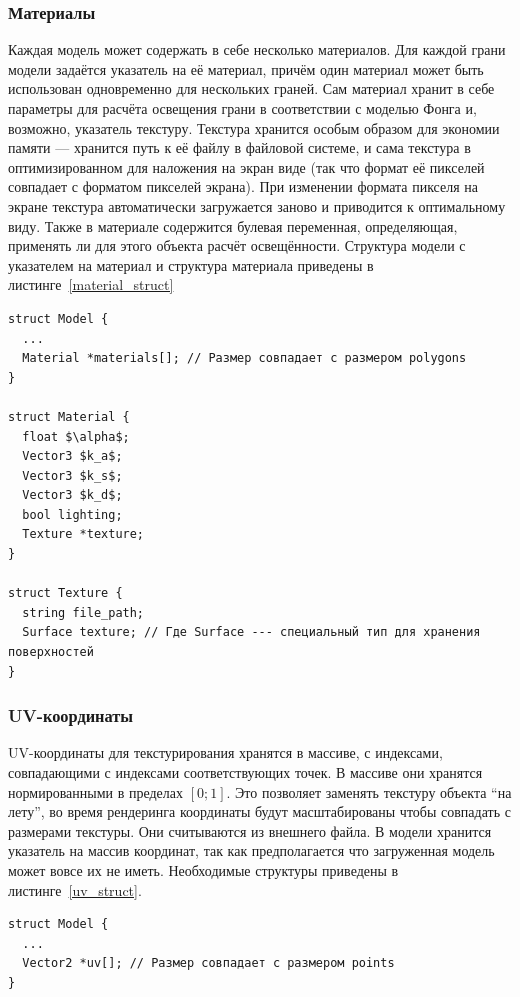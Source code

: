 \documentclass[a4paper,12pt]{report}
\numberwithin{equation}{section}
\begin{document}
\subsubsection{Материалы}
Каждая модель может содержать в себе несколько материалов. Для каждой грани модели задаётся указатель на её материал, причём один материал может быть использован одновременно для нескольких граней. Сам материал хранит в себе параметры для расчёта освещения грани в соответствии с моделью Фонга и, возможно, указатель текстуру. Текстура хранится особым образом для экономии памяти --- хранится путь к её файлу в файловой системе, и сама текстура в оптимизированном для наложения на экран виде (так что формат её пикселей совпадает с форматом пикселей экрана). При изменении формата пикселя на экране текстура автоматически загружается заново и приводится к оптимальному виду. Также в материале содержится булевая переменная, определяющая, применять ли для этого объекта расчёт освещённости. Структура модели с указателем на материал и структура материала приведены в листинге~\ref{material_struct}

\begin{lstlisting}[float=p,caption={Структура данных ``Модель'' с добавленным полем материала и структуры ``Материал'' и ``Текстура''},label=material_struct]
struct Model {
  ...
  Material *materials[]; // Размер совпадает с размером polygons
}

struct Material {
  float $\alpha$;
  Vector3 $k_a$;
  Vector3 $k_s$;
  Vector3 $k_d$;
  bool lighting;
  Texture *texture;
}

struct Texture {
  string file_path;
  Surface texture; // Где Surface --- специальный тип для хранения поверхностей
}
\end{lstlisting}

\subsubsection{UV-координаты}
UV-координаты для текстурирования хранятся в массиве, с индексами, совпадающими с индексами соответствующих точек. В массиве они хранятся нормированными в пределах $[0;1]$. Это позволяет заменять текстуру объекта ``на лету'', во время рендеринга координаты будут масштабированы чтобы совпадать с размерами текстуры. Они считываются из внешнего файла. В модели хранится указатель на массив координат, так как предполагается что загруженная модель может вовсе их не иметь. Необходимые структуры приведены в листинге~\ref{uv_struct}.

\begin{lstlisting}[float=p,caption={Структура данных ``Модель'' с добавленным полем UV-координат},label=uv_struct]
struct Model {
  ...
  Vector2 *uv[]; // Размер совпадает с размером points
}
\end{lstlisting}
\end{document}
